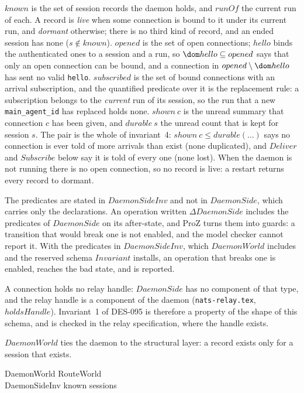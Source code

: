 \documentclass[a4paper,10pt,fleqn]{article}
\begin{document}
$known$ is the set of session records the daemon holds, and $runOf$ the
current run of each.  A record is \emph{live} when some connection is
bound to it under its current run, and \emph{dormant} otherwise; there is
no third kind of record, and an ended session has none ($s \notin known$).
$opened$ is the set of open connections; $hello$ binds the
authenticated ones to a session and a run, so $\dom hello \subseteq
opened$ says that only an open connection can be bound, and a connection
in $opened \setminus \dom hello$ has sent no valid \texttt{hello}.
$subscribed$ is the set of bound connections with an arrival subscription,
and the quantified predicate over it is the replacement rule: a
subscription belongs to the \emph{current} run of its session, so the run
that a new \texttt{main\_agent\_id} has replaced holds none.
$shown~c$ is the unread summary that connection $c$ has been given, and
$durable~s$ the unread count that is kept for session $s$.  The pair is
the whole of invariant~4: $shown~c \leq durable(\ldots)$ says no
connection is ever told of more arrivals than exist (none duplicated),
and $Deliver$ and $Subscribe$ below say it is told of every one (none
lost).  When the daemon is not running there is no open connection, so no
record is live: a restart returns every record to dormant.

The predicates are stated in $DaemonSideInv$ and not in $DaemonSide$, which
carries only the declarations.  An operation written $\Delta DaemonSide$
includes the predicates of $DaemonSide$ on its after-state, and ProZ turns
them into guards: a transition that would break one is not enabled, and the
model checker cannot report it.  With the predicates in $DaemonSideInv$, which
$DaemonWorld$ includes and the reserved schema $Invariant$ installs, an
operation that breaks one is enabled, reaches the bad state, and is reported.

A connection holds no relay handle: $DaemonSide$ has no component of that
type, and the relay handle is a component of the daemon
(\texttt{nats-relay.tex}, $holdsHandle$).  Invariant~1 of DES-095 is
therefore a property of the shape of this schema, and is checked in the
relay specification, where the handle exists.

$DaemonWorld$ ties the daemon to the structural layer: a record exists
only for a session that exists.

\begin{schema}{DaemonWorld}
  RouteWorld \\
  DaemonSideInv
  \where
  known \subseteq sessions
\end{schema}
\end{document}
